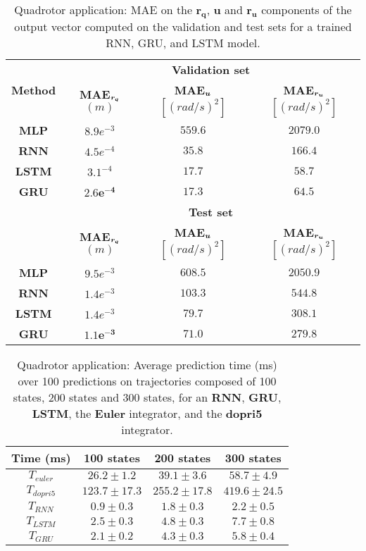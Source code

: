 \begin{table}[h!]
\centering
\begin{tabular}{ | c | c  c  c | }
\hline
    \multirow{2}{*}{\textbf{Method}} & \multicolumn{3}{c|}{\textbf{Validation set}} \\ \cline{2-4}
    & \textbf{MAE$_{\boldsymbol{r_q}}$} $(m)$  & \textbf{MAE$_{\boldsymbol{u}}$} $[(rad/s)^2]$ & \textbf{MAE$_{\boldsymbol{r_u}}$} $[(rad/s)^2]$ \\ \hline
{\textbf{MLP}} & $8.9e^{-3}$ & $559.6$ & $2079.0$ \\ 
{\textbf{RNN}} & $4.5e^{-4}$ & $35.8$ & $166.4$ \\ 
{\textbf{LSTM}} & $3.1^{-4}$ & $17.7$ & $\boldsymbol{58.7}$ \\ 
{\textbf{GRU}} & $\boldsymbol{2.6e^{-4}}$ & $\boldsymbol{17.3}$ & $64.5$ \\ 
\hline
    & \multicolumn{3}{c|}{\textbf{Test set}}\\ \cline{2-4}
    & \textbf{MAE$_{\boldsymbol{r_q}}$} $(m)$  & \textbf{MAE$_{\boldsymbol{u}}$} $[(rad/s)^2]$ & \textbf{MAE$_{\boldsymbol{r_u}}$} $[(rad/s)^2]$ \\ \hline
{\textbf{MLP}} & $9.5e^{-3}$ & $608.5$ & $2050.9$ \\ 
{\textbf{RNN}} &  $1.4e^{-3}$ & $103.3$ & $544.8$ \\ 
{\textbf{LSTM}} & $1.4e^{-3}$ & $79.7$ & $308.1$ \\ 
{\textbf{GRU}} & $\boldsymbol{1.1e^{-3}}$ & $\boldsymbol{71.0}$ & $\boldsymbol{279.8}$ \\ 
\hline
    
\end{tabular}
\caption{
    Quadrotor application: MAE on the $\boldsymbol{r_q}$, $\boldsymbol{u}$ and $\boldsymbol{r_u}$ components of the output vector computed on the validation and test sets for a trained RNN, GRU, and LSTM model.}
    \label{tab:NN_results_table_Q}
\end{table}

\begin{table}[t]
\centering
\begin{tabular}{ | c | c  c  c | }
\hline
    \textbf{Time (ms)} & 100 states  & 200 states & 300 states \\ \hline
    $T_{euler}$ & $26.2 \pm 1.2$ & $39.1 \pm 3.6$ & $58.7 \pm 4.9$ \\ 
$T_{dopri5}$ & $123.7 \pm 17.3$ & $255.2 \pm 17.8$ & $419.6 \pm 24.5$ \\ 
$T_{RNN}$ & $\boldsymbol{0.9} \pm 0.3$ & $\boldsymbol{1.8} \pm 0.3$ & $\boldsymbol{2.2} \pm 0.5$ \\ 
$T_{LSTM}$ & $2.5 \pm 0.3$ & $4.8 \pm 0.3$ & $7.7 \pm 0.8$ \\ 
$T_{GRU}$ & $2.1 \pm 0.2$ & $4.3 \pm 0.3$ & $5.8 \pm 0.4$  \\ \hline
\end{tabular}
\caption{
    Quadrotor application: Average prediction time (ms) over 100 predictions on trajectories composed of 100 states, 200 states and 300 states, for an \textbf{RNN}, \textbf{GRU}, \textbf{LSTM}, the \textbf{Euler} integrator, and the \textbf{dopri5} integrator.}
    \label{tab:timepred}
\end{table}